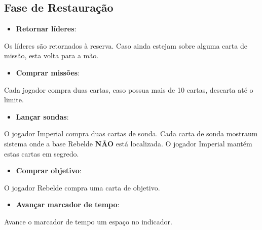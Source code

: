 \documentclass[11pt]{article}
\begin{document}
\subsection{Fase de Restauração}
\label{sec:orgdec8a84}

\begin{itemize}
\item \textbf{Retornar líderes}:
\end{itemize}

Os líderes são retornados à reserva. Caso ainda estejam sobre alguma carta de missão, esta volta para a mão.

\begin{itemize}
\item \textbf{Comprar missões}:
\end{itemize}

Cada jogador compra duas cartas, caso possua mais de 10 cartas, descarta até o limite.

\begin{itemize}
\item \textbf{Lançar sondas}:
\end{itemize}

O jogador Imperial compra duas cartas de sonda. Cada carta de sonda mostraum sistema onde a base Rebelde \textbf{NÃO} está localizada. O jogador Imperial mantém estas cartas em segredo.

\begin{itemize}
\item \textbf{Comprar objetivo}:
\end{itemize}

O jogador Rebelde compra uma carta de objetivo.

\begin{itemize}
\item \textbf{Avançar marcador de tempo}:
\end{itemize}

Avance o marcador de tempo um espaço no indicador.
\end{document}
